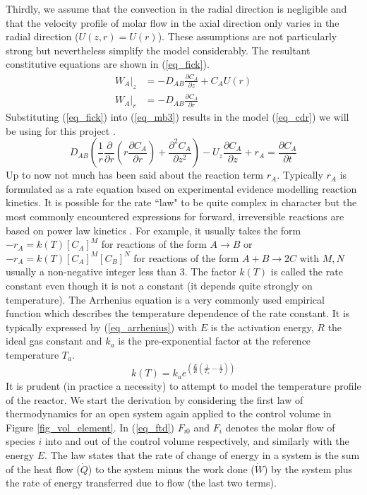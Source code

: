 \documentclass[11pt,fleqn]{article}
\theoremstyle{defstyle}
\begin{document}
Thirdly, we assume that the convection in the radial direction is negligible and that the velocity profile of molar flow in the axial direction only varies in the radial direction ($U(z,r)=U(r)$). These assumptions are not particularly strong but nevertheless simplify the model considerably. The resultant constitutive equations are shown in (\ref{eq_fick}).  
\begin{equation}
\begin{aligned}
W_A|_z &= -D_{AB}\frac{\partial C_A}{\partial z} + C_A U(r) \\
W_A|_r &= -D_{AB}\frac{\partial C_A}{\partial r}  
\end{aligned}
\label{eq_fick}
\end{equation} 
Substituting (\ref{eq_fick}) into (\ref{eq_mb3}) results in the model (\ref{eq_cdr}) we will be using for this project \cite{fogler}.
\begin{equation}
D_{AB}(\frac{1}{r}\frac{\partial}{\partial r}(r\frac{\partial C_A}{\partial r}) + \frac{\partial^2 C_A}{\partial z^2}) - U_z\frac{\partial C_A}{\partial z} + r_A = \frac{\partial C_A}{\partial t}
\label{eq_cdr}
\end{equation}
Up to now not much has been said about the reaction term $r_A$. Typically $r_A$ is formulated as a rate equation based on experimental evidence modelling reaction kinetics. It is possible for the rate ``law" to be quite complex in character but the most commonly encountered expressions for forward, irreversible reactions are based on power law kinetics \cite{delmar}. For example, it usually takes the form $-r_A=k(T)[C_A]^M$ for reactions of the form $A \rightarrow B$ or $-r_A=k(T)[C_A]^M[C_B]^N$ for reactions of the form $A + B \rightarrow 2C$ with $M,N$ usually a non-negative integer less than 3. The factor $k(T)$ is called the rate constant even though it is not a constant (it depends quite strongly on temperature). The Arrhenius equation is a very commonly used empirical function which describes the temperature dependence of the rate constant. It is typically expressed by (\ref{eq_arrhenius}) with $E$ is the activation energy, $R$ the ideal gas constant and $k_a$ is the pre-exponential factor at the reference temperature $T_a$. 
\begin{equation}
k(T) = k_a e^{(\frac{E}{R}(\frac{1}{T_a} - \frac{1}{T}))}
\label{eq_arrhenius}
\end{equation} 
It is prudent (in practice a necessity) to attempt to model the temperature profile of the reactor. We start the derivation by considering the first law of thermodynamics for an open system again applied to the control volume in Figure \ref{fig_vol_element}. In (\ref{eq_ftd}) $F_{i0}$ and $F_{i}$ denotes the molar flow of species $i$ into and out of the control volume respectively, and similarly with the energy $E$. The law states that the rate of change of energy in a system is the sum of the heat flow ($\dot{Q}$) to the system minus the work done ($\dot{W}$) by the system plus the rate of energy transferred due to flow (the last two terms). 
\end{document}
